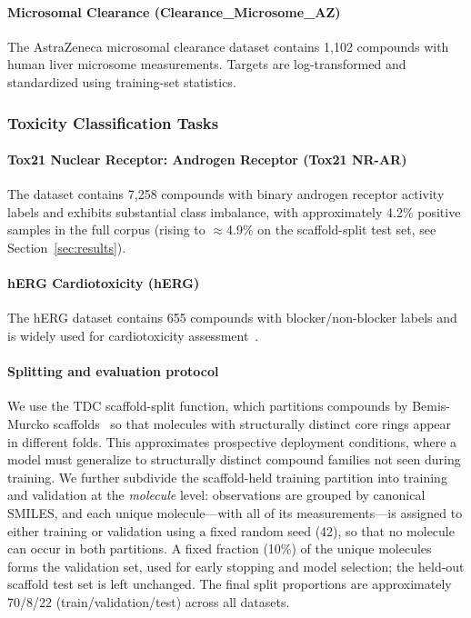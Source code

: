 \documentclass[journal]{IEEEtran}
\begin{document}
\paragraph{Microsomal Clearance (Clearance\_Microsome\_AZ)}
The AstraZeneca microsomal clearance dataset contains 1,102 compounds with human liver microsome measurements. Targets are log-transformed and standardized using training-set statistics.

\subsubsection{Toxicity Classification Tasks}

\paragraph{Tox21 Nuclear Receptor: Androgen Receptor (Tox21 NR-AR)}
The dataset contains 7,258 compounds with binary androgen receptor activity labels and exhibits substantial class imbalance, with approximately 4.2\% positive samples in the full corpus (rising to $\approx$4.9\% on the scaffold-split test set, see Section~\ref{sec:results}).

\paragraph{hERG Cardiotoxicity (hERG)}
The hERG dataset contains 655 compounds with blocker/non-blocker labels and is widely used for cardiotoxicity assessment~\cite{sanguinetti2006herg}.

\paragraph{Splitting and evaluation protocol}
We use the TDC scaffold-split function, which partitions compounds by Bemis-Murcko scaffolds~\cite{doi:10.1021/jm9602928} so that molecules with structurally distinct core rings appear in different folds. This approximates prospective deployment conditions, where a model must generalize to structurally distinct compound families not seen during training. We further subdivide the scaffold-held training partition into training and validation at the \emph{molecule} level: observations are grouped by canonical SMILES, and each unique molecule---with all of its measurements---is assigned to either training or validation using a fixed random seed (42), so that no molecule can occur in both partitions. A fixed fraction (10\%) of the unique molecules forms the validation set, used for early stopping and model selection; the held-out scaffold test set is left unchanged. The final split proportions are approximately 70/8/22 (train/validation/test) across all datasets.
\end{document}
